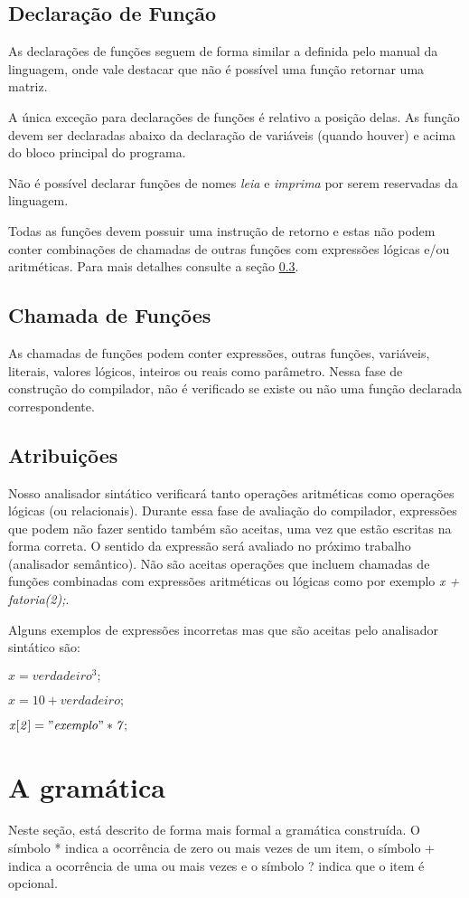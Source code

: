 \documentclass[
12pt,				%
a4paper,			%
english,			%
french,				%
spanish,			%
brazil,				%
article
]{abntex2}
\begin{document}
\subsection{Declaração de Função}
As declarações de funções seguem de forma similar a definida pelo manual da linguagem, onde vale destacar que não é possível uma função retornar uma matriz.

A única exceção para declarações de funções é relativo a posição delas. As função devem ser declaradas abaixo da declaração de variáveis (quando houver) e acima do bloco principal do programa.

Não é possível declarar funções de nomes \textit{leia} e \textit{imprima} por serem reservadas da linguagem.

Todas as funções devem possuir uma instrução de retorno e estas não podem conter combinações de chamadas de outras funções com expressões lógicas e/ou aritméticas. Para mais detalhes consulte a seção \ref{atribuicoes}.

\subsection{Chamada de Funções}
As chamadas de funções podem conter expressões, outras funções, variáveis, literais, valores lógicos, inteiros ou reais como parâmetro. Nessa fase de construção do compilador, não é verificado se existe ou não uma função declarada correspondente.

\subsection{Atribuições}
\label{atribuicoes}
Nosso analisador sintático verificará tanto operações aritméticas como operações lógicas (ou relacionais). Durante essa fase de avaliação do compilador, expressões que podem não fazer sentido também são aceitas, uma vez que estão escritas na forma correta. O sentido da expressão será avaliado no próximo trabalho (analisador semântico). Não são aceitas operações que incluem chamadas de funções combinadas com expressões aritméticas ou lógicas como por exemplo \textit{x + fatoria(2);}.

Alguns exemplos de expressões incorretas mas que são aceitas pelo analisador sintático são:


\begin{math}
	\mathit{x = verdadeiro ^ 3;}
\end{math}

\begin{math}
	\mathit{x = 10 + verdadeiro;}
\end{math}

\begin{math}
	\mathit{x[2] = "exemplo" * 7;}
\end{math}


\section{A gramática}
Neste seção, está descrito de forma mais formal a gramática construída. O símbolo * indica a ocorrência de zero ou mais vezes de um item, o símbolo + indica a ocorrência de uma ou mais vezes e o símbolo ? indica que o item é opcional.
\end{document}
